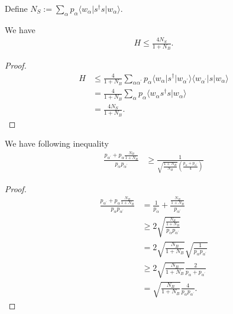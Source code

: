 \documentclass[../../note.tex]{subfiles}
\begin{document}
\begin{definition}
    Define $N_S:= \sum_{\alpha} p_{\alpha} \langle w_{\alpha} \vert s^\dagger s \vert w_{\alpha} \rangle$.
\end{definition}

\begin{lemma}
    We have
    \begin{align}
        H \leq \frac{4 N_S}{1+N_B}.
    \end{align}
\end{lemma}
\begin{proof}
    \begin{align}
        H
        &\leq \frac{4}{1+N_B} \sum_{\alpha \alpha^\prime} p_{\alpha} \langle w_{\alpha} \vert s^\dagger \vert w_{\alpha^\prime} \rangle \langle w_{\alpha^\prime} \vert s \vert w_{\alpha} \rangle  \\
        &= \frac{4}{1+N_B} \sum_{\alpha} p_{\alpha} \langle w_{\alpha} s^\dagger s \vert w_{\alpha} \rangle \\
        &= \frac{4 N_S}{1+N_B}.
    \end{align}
\end{proof}

\begin{lemma}
    We have following inequality
    \begin{align}
        \frac{p_{\alpha^\prime} + p_{\alpha} \frac{N_B}{1+N_B}}{p_{\alpha} p_{\alpha^\prime}} 
        &\geq \frac{1}{\sqrt{\frac{1+N_B}{N_B}} \left(\frac{p_{\alpha} + p_{\alpha^\prime}}{4}\right)}
    \end{align}
\end{lemma}
\begin{proof}
\begin{align}
    \frac{p_{\alpha^\prime} + p_{\alpha} \frac{N_B}{1+N_B}}{p_{\alpha} p_{\alpha^\prime}} 
    &= \frac{1}{p_{\alpha}} + \frac{\frac{N_B}{1+N_B}}{p_{\alpha^\prime}}  \\
    &\geq 2 \sqrt{\frac{\frac{N_B}{1+N_B}}{p_{\alpha} p_{\alpha^\prime}}} \\
    &= 2 \sqrt{\frac{N_B}{1+N_B}} \sqrt{\frac{1}{p_{\alpha} p_{\alpha^\prime}}} \\
    &\geq 2 \sqrt{\frac{N_B}{1+N_B}} \frac{2}{p_{\alpha} + p_{\alpha^\prime}} \\
    &= \sqrt{\frac{N_B}{1+N_B}} \frac{4}{p_{\alpha} p_{\alpha^\prime}}.
\end{align}    
\end{proof}
\end{document}
